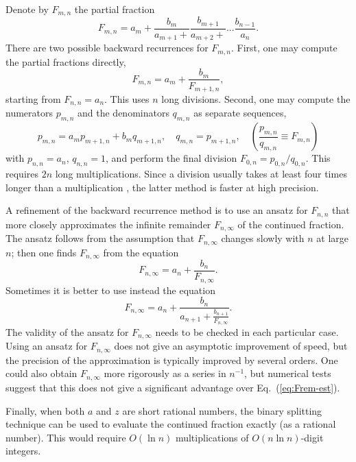 \documentclass{llncs}
\begin{document}
Denote by $F_{m,n}$ the partial fraction \begin{equation}
F_{m,n}=a_{m}+\frac{b_{m}}{a_{m+1}+}\frac{b_{m+1}}{a_{m+2}+}...\frac{b_{n-1}}{a_{n}}.\end{equation}
There are two possible backward recurrences for $F_{m,n}$. First,
one may compute the partial fractions directly,\begin{equation}
F_{m,n}=a_{m}+\frac{b_{m}}{F_{m+1,n}},\end{equation}
starting from $F_{n,n}=a_{n}$. This uses $n$ long divisions. Second,
one may compute the numerators $p_{m,n}$ and the denominators $q_{m,n}$
as separate sequences,\begin{equation}
p_{m,n}=a_{m}p_{m+1,n}+b_{m}q_{m+1,n},\quad q_{m,n}=p_{m+1,n},\quad \left(\frac{p_{m,n}}{q_{m,n}}\equiv F_{m,n}\right)\end{equation}
 with $p_{n,n}=a_{n}$, $q_{n,n}=1$, and perform the final division
$F_{0,n}=p_{0,n}/q_{0,n}$. This requires $2n$ long multiplications.
Since a division usually takes at least four times longer than a multiplication
\cite{KM97}, the latter method is faster at high precision.

A refinement of the backward recurrence method \cite{Ts88} is to
use an ansatz for $F_{n,n}$ that more closely approximates the infinite
remainder $F_{n,\infty }$ of the continued fraction. The ansatz follows
from the assumption that $F_{n,\infty }$ changes slowly with $n$
at large $n$; then one finds $F_{n,\infty }$ from the equation\begin{equation}
F_{n,\infty }=a_{n}+\frac{b_{n}}{F_{n,\infty }}.\end{equation}
Sometimes it is better to use instead the equation\begin{equation}
F_{n,\infty }=a_{n}+\frac{b_{n}}{a_{n+1}+\frac{b_{n+1}}{F_{n,\infty }}}.\label{eq:Frem-est}\end{equation}
The validity of the ansatz for $F_{n,\infty }$ needs to be checked
in each particular case. Using an ansatz for $F_{n,\infty }$ does
not give an asymptotic improvement of speed, but the precision of
the approximation is typically improved by several orders. One could
also obtain $F_{n,\infty }$ more rigorously as a series in $n^{-1}$,
but numerical tests suggest that this does not give a significant
advantage over Eq.~(\ref{eq:Frem-est}).

Finally, when both $a$ and $z$ are short rational numbers, the binary
splitting technique can be used to evaluate the continued fraction
exactly (as a rational number). This would require $O\left(\ln n\right)$
multiplications of $O\left(n\ln n\right)$-digit integers.
\end{document}
